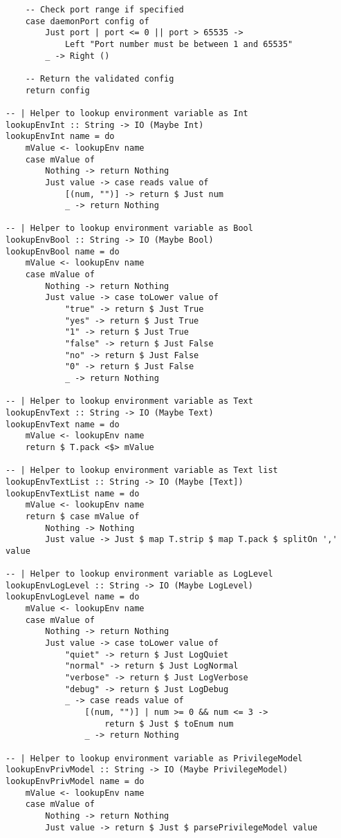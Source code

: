 \documentclass{article}
\begin{document}
\begin{tcolorbox}[title=Ten/Daemon/Config.hs Changes]
\begin{verbatim}
    -- Check port range if specified
    case daemonPort config of
        Just port | port <= 0 || port > 65535 ->
            Left "Port number must be between 1 and 65535"
        _ -> Right ()

    -- Return the validated config
    return config

-- | Helper to lookup environment variable as Int
lookupEnvInt :: String -> IO (Maybe Int)
lookupEnvInt name = do
    mValue <- lookupEnv name
    case mValue of
        Nothing -> return Nothing
        Just value -> case reads value of
            [(num, "")] -> return $ Just num
            _ -> return Nothing

-- | Helper to lookup environment variable as Bool
lookupEnvBool :: String -> IO (Maybe Bool)
lookupEnvBool name = do
    mValue <- lookupEnv name
    case mValue of
        Nothing -> return Nothing
        Just value -> case toLower value of
            "true" -> return $ Just True
            "yes" -> return $ Just True
            "1" -> return $ Just True
            "false" -> return $ Just False
            "no" -> return $ Just False
            "0" -> return $ Just False
            _ -> return Nothing

-- | Helper to lookup environment variable as Text
lookupEnvText :: String -> IO (Maybe Text)
lookupEnvText name = do
    mValue <- lookupEnv name
    return $ T.pack <$> mValue

-- | Helper to lookup environment variable as Text list
lookupEnvTextList :: String -> IO (Maybe [Text])
lookupEnvTextList name = do
    mValue <- lookupEnv name
    return $ case mValue of
        Nothing -> Nothing
        Just value -> Just $ map T.strip $ map T.pack $ splitOn ',' value

-- | Helper to lookup environment variable as LogLevel
lookupEnvLogLevel :: String -> IO (Maybe LogLevel)
lookupEnvLogLevel name = do
    mValue <- lookupEnv name
    case mValue of
        Nothing -> return Nothing
        Just value -> case toLower value of
            "quiet" -> return $ Just LogQuiet
            "normal" -> return $ Just LogNormal
            "verbose" -> return $ Just LogVerbose
            "debug" -> return $ Just LogDebug
            _ -> case reads value of
                [(num, "")] | num >= 0 && num <= 3 ->
                    return $ Just $ toEnum num
                _ -> return Nothing

-- | Helper to lookup environment variable as PrivilegeModel
lookupEnvPrivModel :: String -> IO (Maybe PrivilegeModel)
lookupEnvPrivModel name = do
    mValue <- lookupEnv name
    case mValue of
        Nothing -> return Nothing
        Just value -> return $ Just $ parsePrivilegeModel value


\end{verbatim}
\end{tcolorbox}
\end{document}
